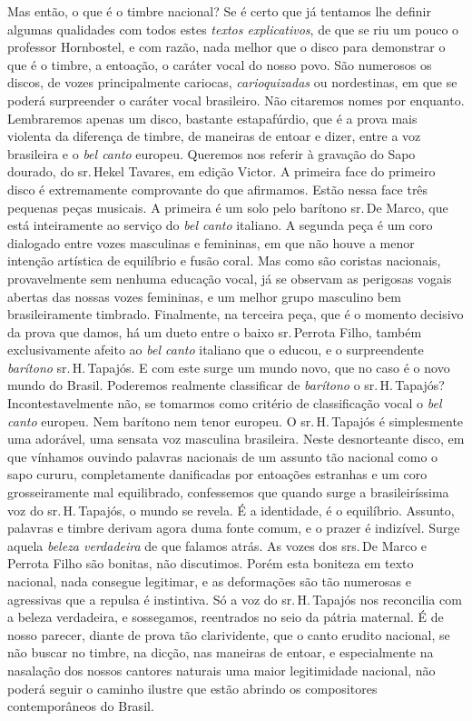Mas então, o que é o timbre nacional? Se é certo que já tentamos lhe
definir algumas qualidades com todos estes \textit{textos explicativos}, de
que se riu um pouco o professor Hornbostel, e com razão, nada melhor que
o disco para demonstrar o que é o timbre, a entoação, o caráter vocal do
nosso povo. São numerosos os discos, de vozes principalmente cariocas,
\textit{carioquizadas} ou nordestinas, em que se poderá surpreender o caráter
vocal brasileiro. Não citaremos nomes por enquanto. Lembraremos apenas
um disco, bastante estapafúrdio, que é a prova mais violenta da
diferença de timbre, de maneiras de entoar e dizer, entre a voz
brasileira e o \textit{bel canto} europeu. Queremos nos referir à gravação do
Sapo dourado, do sr.\,Hekel Tavares, em edição Victor. A primeira face do
primeiro disco é extremamente comprovante do que afirmamos. Estão nessa
face três pequenas peças musicais. A primeira é um solo pelo barítono
sr.\,De Marco, que está inteiramente ao serviço do \textit{bel canto} italiano. A
segunda peça é um coro dialogado entre vozes masculinas e femininas, em
que não houve a menor intenção artística de equilíbrio e fusão coral.
Mas como são coristas nacionais, provavelmente sem nenhuma educação
vocal, já se observam as perigosas vogais abertas das nossas vozes
femininas, e um melhor grupo masculino bem brasileiramente timbrado.
Finalmente, na terceira peça, que é o momento decisivo da prova que
damos, há um dueto entre o baixo sr.\,Perrota Filho, também
exclusivamente afeito ao \textit{bel canto} italiano que o educou, e o
surpreendente \textit{barítono} sr.\,H.\,Tapajós. E com este surge um mundo
novo, que no caso é o novo mundo do Brasil. Poderemos realmente
classificar de \textit{barítono} o sr.\,H.\,Tapajós? Incontestavelmente não, se
tomarmos como critério de classificação vocal o \textit{bel canto} europeu. Nem
barítono nem tenor europeu. O sr.\,H.\,Tapajós é simplesmente uma
adorável, uma sensata voz masculina brasileira. Neste desnorteante
disco, em que vínhamos ouvindo palavras nacionais de um assunto tão
nacional como o sapo cururu, completamente danificadas por entoações
estranhas e um coro grosseiramente mal equilibrado, confessemos que
quando surge a brasileiríssima voz do sr.\,H.\,Tapajós, o mundo se revela.
É a identidade, é o equilíbrio. Assunto, palavras e timbre derivam agora
duma fonte comum, e o prazer é indizível. Surge aquela \textit{beleza
verdadeira} de que falamos atrás. As vozes dos srs.\,De Marco e Perrota
Filho são bonitas, não discutimos. Porém esta boniteza em texto
nacional, nada consegue legitimar, e as deformações são tão numerosas e
agressivas que a repulsa é instintiva. Só a voz do sr.\,H.\,Tapajós nos
reconcilia com a beleza verdadeira, e sossegamos, reentrados no seio da
pátria maternal. É de nosso parecer, diante de prova tão clarividente,
que o canto erudito nacional, se não buscar no timbre, na dicção, nas
maneiras de entoar, e especialmente na nasalação dos nossos cantores
naturais uma maior legitimidade nacional, não poderá seguir o caminho
ilustre que estão abrindo os compositores contemporâneos do Brasil.


